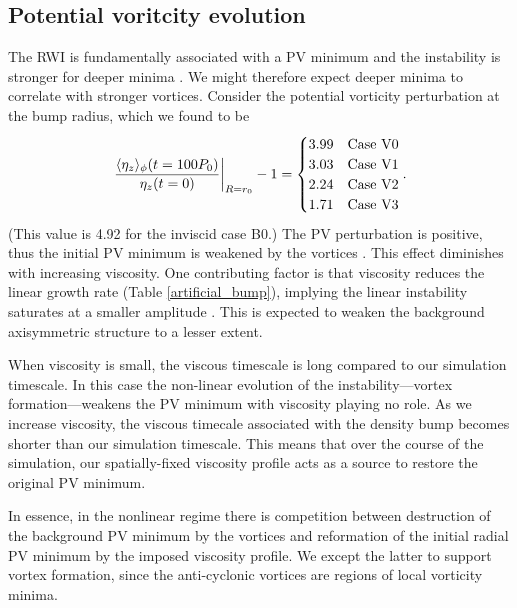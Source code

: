 \subsection{Potential voritcity evolution}
The RWI is fundamentally associated with a PV minimum and the
instability is stronger for deeper minima \citep{li00}. We might
therefore expect deeper minima to correlate with stronger vortices. 
Consider the potential vorticity perturbation at the bump radius,
which we found to be  
\begin{align}\label{vortensity_pert}
  \left.\frac{\langle \eta_z \rangle_\phi(t=100P_0)}{\eta_z(t=0)}\right|_{R=r_0} - 1 = 
  \begin{cases}
    3.99  & \text{Case V0} \\
   3.03  & \text{Case V1} \\
   2.24  & \text{Case V2} \\
   1.71  & \text{Case V3} \\
  \end{cases}.
\end{align} 
(This value is 4.92 for the inviscid case B0.) The PV
perturbation is positive, thus the initial PV minimum is weakened
by the vortices \citep{meheut10}. This effect
diminishes with increasing viscosity. One contributing factor is 
that viscosity reduces the linear growth rate (Table
\ref{artificial_bump}), implying the linear 
instability saturates at a smaller amplitude \citep{meheut13}. This  
is expected to weaken the background axisymmetric structure to a lesser
extent.    

When viscosity is small, the viscous timescale is long compared to our
simulation timescale. In this case the non-linear evolution of the
instability---vortex formation---weakens the PV minimum with viscosity
playing no role. As we increase viscosity, the viscous timecale
associated with the density bump becomes shorter than our simulation
timescale. %
This means that over the course of the simulation, our spatially-fixed
viscosity profile acts as a source to restore the original PV minimum. 

In essence, in the nonlinear regime there is competition 
between destruction of the background PV minimum by the 
vortices and reformation of the initial radial PV minimum by the
imposed viscosity profile. We except the latter to support vortex
formation, since the anti-cyclonic vortices are regions of local
vorticity minima. 
 




